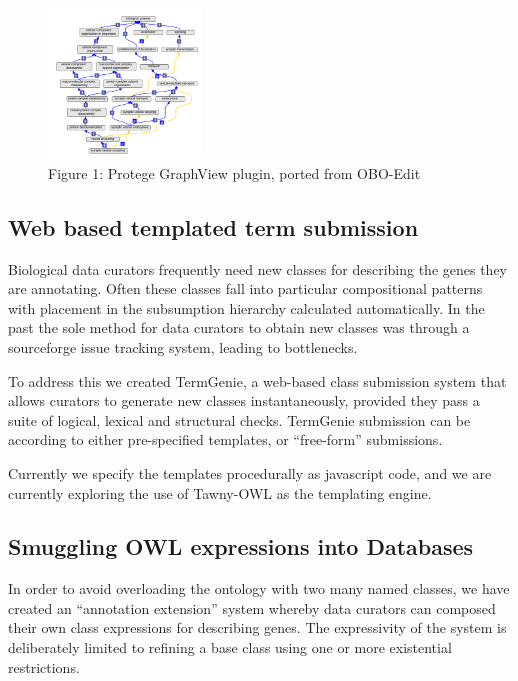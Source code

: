 \documentclass{llncs}
\begin{document}
\begin{figure}
\label{gv}
\center
\includegraphics[height=4cm]{gv-plugin}
\caption{Figure 1: Protege GraphView plugin, ported from OBO-Edit}
\end{figure}

\subsection{Web based templated term submission}

Biological data curators frequently need new classes for describing
the genes they are annotating. Often these classes fall into
particular compositional patterns with placement in the subsumption
hierarchy calculated automatically. In the past the sole method for
data curators to obtain new classes was through a sourceforge issue
tracking system, leading to bottlenecks.

To address this we created TermGenie\cite{Dietze2014}, a web-based
class submission system that allows curators to generate new classes
instantaneously, provided they pass a suite of logical, lexical and
structural checks. TermGenie submission can be according to either
pre-specified templates, or ``free-form'' submissions.

Currently we specify the templates procedurally as javascript code,
and we are currently exploring the use of Tawny-OWL\cite{Tawny} as the
templating engine.


\subsection{Smuggling OWL expressions into Databases}

In order to avoid overloading the ontology with two many named
classes, we have created an ``annotation extension'' system whereby
data curators can composed their own class expressions for describing
genes\cite{Huntley2014}. The expressivity of the system is
deliberately limited to refining a base class using one or more
existential restrictions.
\end{document}
